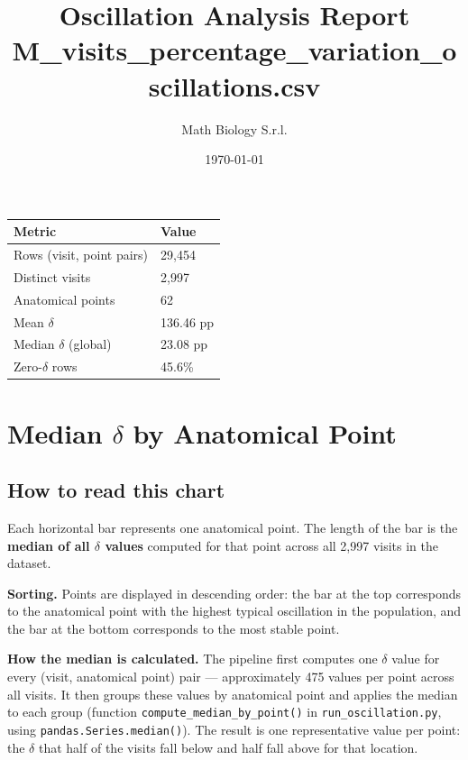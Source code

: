 \documentclass[11pt,a4paper]{article}
\title{%
  \textcolor{mathdark}{\textbf{Oscillation Analysis Report}}\\[4pt]
  \large M\_visits\_percentage\_variation\_oscillations.csv}
\author{Math Biology S.r.l.}
\date{\today}
\begin{document}
\maketitle
\tableofcontents
\bigskip

\noindent
\begin{tabular}{@{}ll@{}}
\toprule
\textbf{Metric} & \textbf{Value} \\
\midrule
Rows (visit, point pairs) & 29,454 \\
Distinct visits           & 2,997 \\
Anatomical points         & 62 \\
Mean $\delta$             & 136.46 pp \\
Median $\delta$ (global)  & 23.08 pp \\
Zero-$\delta$ rows        & 45.6\% \\
\bottomrule
\end{tabular}

\newpage

\section{Median \texorpdfstring{$\delta$}{delta} by Anatomical Point}

\subsection*{How to read this chart}

Each horizontal bar represents one anatomical point.
The length of the bar is the \textbf{median of all $\delta$ values} computed for
that point across all 2,997 visits in the dataset.

\textbf{Sorting.}
Points are displayed in descending order: the bar at the top corresponds to the
anatomical point with the highest typical oscillation in the population, and the
bar at the bottom corresponds to the most stable point.

\textbf{How the median is calculated.}
The pipeline first computes one $\delta$ value for every (visit, anatomical point)
pair --- approximately 475 values per
point across all visits.
It then groups these values by anatomical point and applies the median to each
group (function \texttt{compute\_median\_by\_point()} in
\texttt{run\_oscillation.py}, using \texttt{pandas.Series.median()}).
The result is one representative value per point: the $\delta$ that half of
the visits fall below and half fall above for that location.
\end{document}
